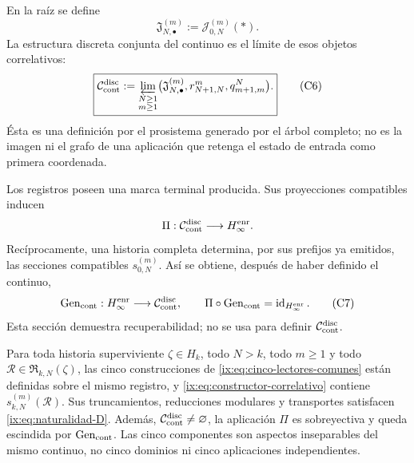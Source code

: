 En la raíz se define
\[
 \mathfrak J_{N,\bullet}^{(m)}:=\mathcal J_{0,N}^{(m)}(\ast).
\tag{C5}
\label{ix:eq:fibras-conjuntas-horizonte}
\]
La estructura discreta conjunta del continuo es el límite de esos objetos
correlativos:
\[
 \boxed{
 \mathcal C_{\rm cont}^{\rm disc}
 :=\varprojlim_{\substack{N\geq1\\m\geq1}}
   \bigl(\mathfrak J_{N,\bullet}^{(m)},
         r^m_{N+1,N},q^N_{m+1,m}\bigr).}
\tag{C6}
\label{ix:eq:continuo-discreto}
\]
Ésta es una definición por el prosistema generado por el árbol completo; no es
la imagen ni el grafo de una aplicación que retenga el estado de entrada como
primera coordenada.

Los registros poseen una marca terminal producida. Sus proyecciones compatibles
inducen
\[
 \Pi:\mathcal C_{\rm cont}^{\rm disc}\longrightarrow H_\infty^{\rm enr}.
\]
Recíprocamente, una historia completa determina, por sus prefijos ya emitidos,
las secciones compatibles \(s_{0,N}^{(m)}\). Así se obtiene, después de haber
definido el continuo,
\[
 \operatorname{Gen}_{\rm cont}:H_\infty^{\rm enr}
 \longrightarrow\mathcal C_{\rm cont}^{\rm disc},
 \qquad
 \Pi\circ\operatorname{Gen}_{\rm cont}
 =\operatorname{id}_{H_\infty^{\rm enr}}.
\tag{C7}
\label{ix:eq:seccion-historias-continuo}
\]
Esta sección demuestra recuperabilidad; no se usa para definir
\(\mathcal C_{\rm cont}^{\rm disc}\).

\begin{theorem}
\label{ix:thm:correlacion-cinco}
Para toda historia superviviente \(\zeta\in H_k\), todo \(N>k\), todo
\(m\geq1\) y todo \(\mathscr R\in\mathfrak R_{k,N}(\zeta)\), las cinco
construcciones de \eqref{ix:eq:cinco-lectores-comunes} están definidas sobre el
mismo registro, y \eqref{ix:eq:constructor-correlativo} contiene
\(s_{k,N}^{(m)}(\mathscr R)\). Sus truncamientos, reducciones modulares y
transportes satisfacen \eqref{ix:eq:naturalidad-D}. Además,
\(\mathcal C_{\rm cont}^{\rm disc}\neq\varnothing\), la aplicación \(\Pi\)
es sobreyectiva y queda escindida por \(\operatorname{Gen}_{\rm cont}\). Las
cinco componentes son aspectos inseparables del mismo continuo, no cinco
dominios ni cinco aplicaciones independientes.
\end{theorem}

